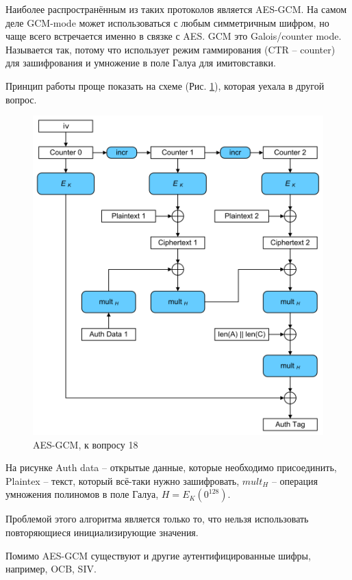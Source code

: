 Наиболее распространённым из таких протоколов является AES-GCM. На самом деле GCM-mode может использоваться с любым симметричным шифром, но чаще всего встречается именно в связке с AES. GCM это Galois/counter mode. Называется так, потому что использует режим гаммирования (CTR -- counter) для зашифрования и умножение в поле Галуа для имитовставки. 

Принцип работы проще показать на схеме (Рис. \ref{fig:fig18-1}), которая уехала в другой вопрос. 

\begin{figure}[h]
	\centering
	
	\includegraphics[width=0.8\linewidth]{Вопросы/q18-pic/AES-GCM.png}
	
	\caption{AES-GCM, к вопросу 18}
	
	\label{fig:fig18-1}
	
\end{figure}

На рисунке Auth data -- открытые данные, которые необходимо присоединить, Plaintex -- текст, который всё-таки нужно зашифровать, $mult_H$ -- операция умножения полиномов в поле Галуа, $H = E_K(0^{128})$. 

Проблемой этого алгоритма является только то, что нельзя использовать повторяющиеся инициализирующие значения. 

Помимо AES-GCM существуют и другие аутентифицированные шифры, например, OCB, SIV. 


 

